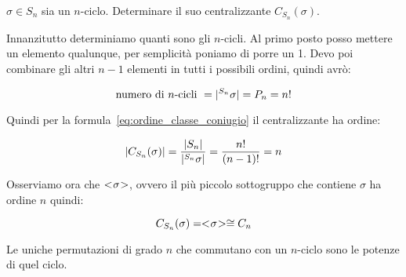 \begin{esercizio}
	$\sigma \in S_n$ sia un $n$-ciclo. Determinare il suo centralizzante $C_{S_n}(\sigma)$.
\end{esercizio}
\begin{soluzione}
	Innanzitutto determiniamo quanti sono gli $n$-cicli. Al primo posto posso mettere un elemento qualunque, per semplicità poniamo di porre un 1. Devo poi combinare gli altri $n-1$ elementi in tutti i possibili ordini, quindi avrò:
	
	\begin{equation}
		\text{numero di $n$-cicli } = \lvert ^{S_n}\sigma \rvert = P_n = n! 
	\end{equation}  

	Quindi per la formula~\eqref{eq:ordine_classe_coniugio} il centralizzante ha ordine:
	
	\begin{equation}
		\lvert C_{S_n}(\sigma) \rvert = \dfrac{\lvert S_n \rvert}{\lvert ^{S_n}\sigma \rvert} = \dfrac{n!}{(n-1)!} = n
	\end{equation}

	Osserviamo ora che $< \negmedspace \sigma \negmedspace >$, ovvero il più piccolo sottogruppo che contiene $\sigma$ ha ordine $n$ quindi:
	
	\begin{equation}
		C_{S_n}(\sigma) = < \negmedspace \sigma \negmedspace > \cong C_n
	\end{equation}

	Le uniche permutazioni di grado $n$ che commutano con un $n$-ciclo sono le potenze di quel ciclo.
\end{soluzione}

